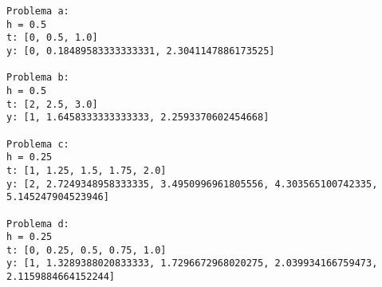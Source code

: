 \documentclass[
  letterpaper,
  DIV=11,
  numbers=noendperiod]{scrartcl}
\begin{document}
\begin{verbatim}
Problema a:
h = 0.5
t: [0, 0.5, 1.0]
y: [0, 0.18489583333333331, 2.3041147886173525]

Problema b:
h = 0.5
t: [2, 2.5, 3.0]
y: [1, 1.6458333333333333, 2.2593370602454668]

Problema c:
h = 0.25
t: [1, 1.25, 1.5, 1.75, 2.0]
y: [2, 2.7249348958333335, 3.4950996961805556, 4.303565100742335, 5.145247904523946]

Problema d:
h = 0.25
t: [0, 0.25, 0.5, 0.75, 1.0]
y: [1, 1.3289388020833333, 1.7296672968020275, 2.039934166759473, 2.1159884664152244]
\end{verbatim}
\end{document}
